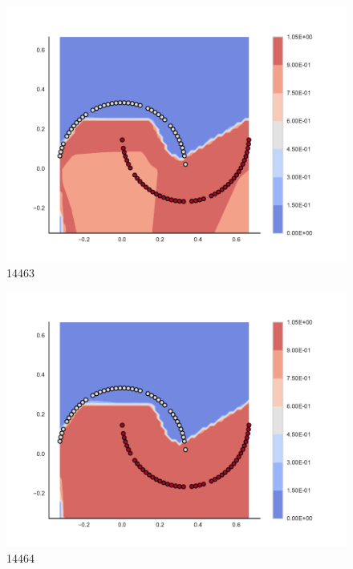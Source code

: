 \begin{subfigure}[b]{0.09\textwidth}
    \includegraphics[clip, trim=2.35cm 1.75cm 4.5cm 0cm,width=\textwidth]{img/convergence/14463.pdf}
    \caption{14463}
    \label{fig:convergence_14463}
\end{subfigure}
%
\begin{subfigure}[b]{0.09\textwidth}
    \includegraphics[clip, trim=2.35cm 1.75cm 4.5cm 0cm,width=\textwidth]{img/convergence/14464.pdf}
    \caption{14464}
    \label{fig:convergence_14464}
\end{subfigure}
%
